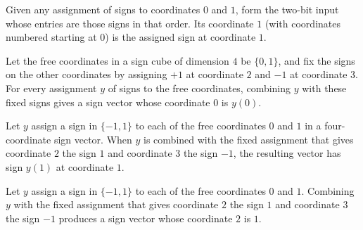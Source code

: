 \begin{theorem}
\label{FABL.example3_19TwoBitInput_one}
\leanok
{}
Given any assignment of signs to coordinates $0$ and $1$, form the two-bit input whose
entries are those signs in that order. Its coordinate $1$ (with coordinates numbered
starting at $0$) is the assigned sign at coordinate $1$.
\end{theorem}

\begin{theorem}
\label{FABL.combineSignCube_example3_19_zero}
\leanok
{}
Let the free coordinates in a sign cube of dimension $4$ be $\{0,1\}$, and fix the signs
on the other coordinates by assigning $+1$ at coordinate $2$ and $-1$ at coordinate $3$.
For every assignment $y$ of signs to the free coordinates, combining $y$ with these
fixed signs gives a sign vector whose coordinate $0$ is $y(0)$.
\end{theorem}

\begin{theorem}
\label{FABL.combineSignCube_example3_19_one}
\leanok
{}
Let $y$ assign a sign in $\{ -1,1 \}$ to each of the free coordinates $0$ and $1$ in a
four-coordinate sign vector. When $y$ is combined with the fixed assignment that gives
coordinate $2$ the sign $1$ and coordinate $3$ the sign $-1$, the resulting vector has
sign $y(1)$ at coordinate $1$.
\end{theorem}

\begin{theorem}
\label{FABL.combineSignCube_example3_19_two}
\leanok
{}
Let $y$ assign a sign in $\{ -1,1\}$ to each of the free coordinates $0$ and $1$.
Combining $y$ with the fixed assignment that gives coordinate $2$ the sign $1$ and
coordinate $3$ the sign $-1$ produces a sign vector whose coordinate $2$ is $1$.
\end{theorem}

